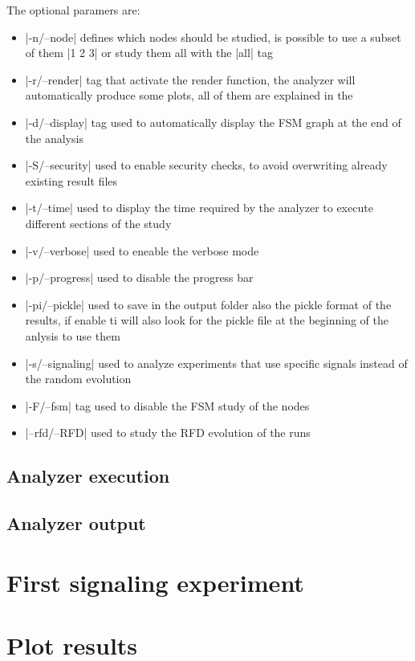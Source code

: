\documentclass[10pt,journal,onecolumn]{IEEEtran}
\begin{document}
The optional paramers are:
\begin{itemize}
	\item |-n/--node| defines which nodes should be studied, is possible
		to use a subset of them |1 2 3| or study them all with the |all| tag
	\item |-r/--render| tag that activate the render function, the analyzer
		will automatically produce some plots, all of them are explained in the
	\item |-d/--display| tag used to automatically display the \ac{FSM}
		graph at the end of the analysis
	\item |-S/--security| used to enable security checks, to avoid
		overwriting already existing result files
	\item |-t/--time| used to display the time required by the analyzer
		to execute different sections of the study
	\item |-v/--verbose| used to eneable the verbose mode
	\item |-p/--progress| used to disable the progress bar
	\item |-pi/--pickle| used to save in the output folder also the pickle
		format of the results, if enable ti will also look for the pickle
		file at the beginning of the anlysis to use them
	\item |-s/--signaling| used to analyze experiments that use specific
		signals instead of the random evolution
	\item |-F/--fsm| tag used to disable the \ac{FSM} study of the nodes
	\item |--rfd/--RFD| used to study the \ac{RFD} evolution of the runs
\end{itemize}

\subsection{Analyzer execution}
\label{subsec:anal_exec}

\subsection{Analyzer output}
\label{subsec:anal_output}

\section{First signaling experiment}
\label{sec:signaling_experiment}

\section{Plot results}
\label{sec:plot_results}
\end{document}

